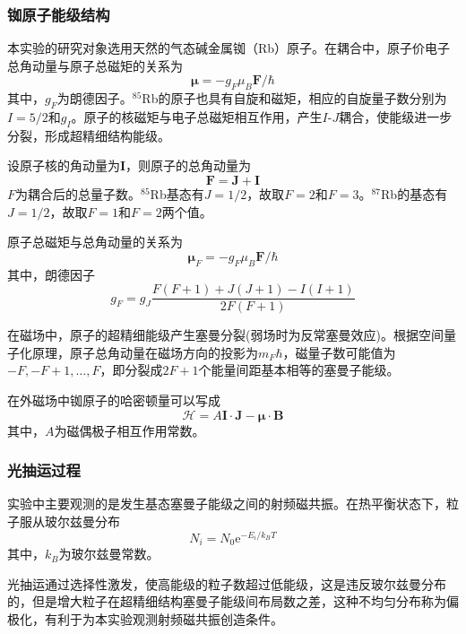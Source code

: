 \subsubsection{铷原子能级结构}
本实验的研究对象选用天然的气态碱金属铷（Rb）原子。在耦合中，原子价电子总角动量与原子总磁矩的关系为
$$
\boldsymbol{\mu} = -g_F \mu_B \mathbf{F}/\hbar
$$
其中，$g_F$为朗德因子。$^{85}$Rb的原子也具有自旋和磁矩，相应的自旋量子数分别为$I=5/2$和$g_I$。原子的核磁矩与电子总磁矩相互作用，产生$I$-$J$耦合，使能级进一步分裂，形成超精细结构能级。

设原子核的角动量为$\mathbf{I}$，则原子的总角动量为
$$
\mathbf{F} = \mathbf{J} + \mathbf{I}
$$
$F$为耦合后的总量子数。$^{85}$Rb基态有$J=1/2$，故取$F=2$和$F=3$。$^{87}$Rb的基态有$J=1/2$，故取$F=1$和$F=2$两个值。

原子总磁矩与总角动量的关系为
$$
\boldsymbol{\mu}_F = -g_F \mu_B \mathbf{F}/\hbar
$$
其中，朗德因子
$$
g_F = g_J \frac{F(F+1) + J(J+1) - I(I+1)}{2F(F+1)}
$$

在磁场中，原子的超精细能级产生塞曼分裂(弱场时为反常塞曼效应)。根据空间量子化原理，原子总角动量在磁场方向的投影为$m_F\hbar$，磁量子数可能值为$-F, -F+1, \dots, F$，即分裂成$2F+1$个能量间距基本相等的塞曼子能级。

在外磁场中铷原子的哈密顿量可以写成
$$
\mathcal{H} = A \mathbf{I} \cdot \mathbf{J} - \boldsymbol{\mu} \cdot \mathbf{B}
$$
其中，$A$为磁偶极子相互作用常数。

\subsubsection{光抽运过程}
实验中主要观测的是发生基态塞曼子能级之间的射频磁共振。在热平衡状态下，粒子服从玻尔兹曼分布
$$
N_i = N_0 \mathrm{e}^{-E_i/k_B T}
$$
其中，$k_B$为玻尔兹曼常数。


光抽运通过选择性激发，使高能级的粒子数超过低能级，这是违反玻尔兹曼分布的，但是增大粒子在超精细结构塞曼子能级间布局数之差，这种不均匀分布称为偏极化，有利于为本实验观测射频磁共振创造条件。

